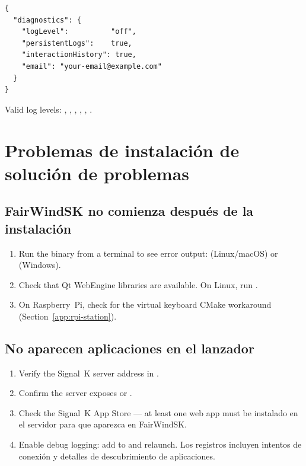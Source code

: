 \begin{lstlisting}
{
  "diagnostics": {
    "logLevel":          "off",
    "persistentLogs":    true,
    "interactionHistory": true,
    "email": "your-email@example.com"
  }
}
\end{lstlisting}

Valid log levels: , , ,
, , .

\section{Problemas de instalación de solución de problemas}
\label{app:troubleshooting-install}

\subsection{FairWindSK no comienza después de la instalación}

\begin{enumerate}
  \item Run the binary from a terminal to see error output:
         (Linux/macOS) or
         (Windows).
  \item Check that Qt WebEngine libraries are available.
        On Linux, run .
  \item On Raspberry~Pi, check for the virtual keyboard CMake workaround
        (Section~\ref{app:rpi-station}).
\end{enumerate}

\subsection{No aparecen aplicaciones en el lanzador}

\begin{enumerate}
  \item Verify the Signal~K server address in
        .
  \item Confirm the server exposes
         or .
  \item Check the Signal~K App Store --- at least one web app must be
instalado en el servidor para que aparezca en FairWindSK.
  \item Enable debug logging: add  to
         and relaunch.
Los registros incluyen intentos de conexión y detalles de descubrimiento de aplicaciones.
\end{enumerate}

